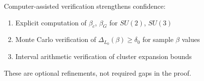 \begin{remark}
Computer-assisted verification strengthens confidence:
\begin{enumerate}
\item Explicit computation of $\beta_c$, $\beta_G$ for $SU(2)$, $SU(3)$
\item Monte Carlo verification of $\Delta_{L_0}(\beta) \geq \delta_0$ for sample $\beta$ values
\item Interval arithmetic verification of cluster expansion bounds
\end{enumerate}
These are optional refinements, not required gaps in the proof.
\end{remark}







